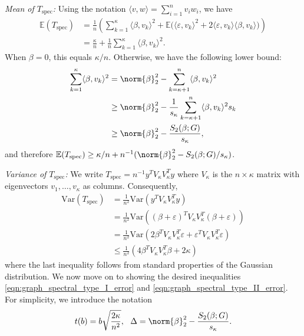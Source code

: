 \documentclass{article}
\newcommand{\Var}{\mathrm{Var}}
\newcommand{\1}{\mathbf{1}}
\newcommand{\Ebb}{\mathbb{E}}
\newcommand{\dotp}[2]{\langle #1, #2 \rangle}
\newcommand{\spec}{\mathrm{spec}}
\theoremstyle{alden}
\theoremstyle{aldenthm}
\theoremstyle{definition}
\theoremstyle{remark}
\begin{document}
\textit{Mean of $T_{\mathrm{spec}}$:} Using the notation $\dotp{v}{w} = \sum_{i = 1}^{n} v_iw_i$, we have
\begin{align*}
\Ebb(T_{\spec}) & = \frac{1}{n}\left(\sum_{k = 1}^{\kappa} \dotp{\beta}{v_k}^2 + \Ebb\bigl( \dotp{\varepsilon}{v_k}^2 + 2 \dotp{\varepsilon}{v_k} \dotp{\beta}{v_k}\bigr)\right) \\
& = \frac{\kappa}{n} + \frac{1}{n}\sum_{k = 1}^{\kappa}\dotp{\beta}{v_k}^2.
\end{align*}
When $\beta = 0$, this equals $\kappa/n$. Otherwise, we have the following lower bound:
\begin{align*}
\sum_{k = 1}^{\kappa}\dotp{\beta}{v_k}^2 & = \norm{\beta}_2^2 - \sum_{k = \kappa + 1}^{n} \dotp{\beta}{v_k}^2 \\
& \geq \norm{\beta}_2^2 - \frac{1}{s_{\kappa}}\sum_{k = \kappa + 1}^{n} \dotp{\beta}{v_k}^2 s_k \\
& \geq \norm{\beta}_2^2 - \frac{S_2(\beta;G)}{s_{\kappa}},
\end{align*}
and therefore $\Ebb(T_{\spec}) \geq \kappa/n + n^{-1}(\norm{\beta}_2^2 - S_2(\beta;G)/s_{\kappa})$. 

\vspace{.2 in}

\textit{Variance of $T_{\mathrm{spec}}$:}
We write $T_{\mathrm{spec}} = n^{-1} y^T V_{\kappa} V_{\kappa}^T y$ where $V_{\kappa}$ is the $n \times \kappa$ matrix with eigenvectors $v_1,\ldots,v_{\kappa}$ as columns. Consequently,
\begin{align}
\Var(T_{\spec}) & = \frac{1}{n^2} \Var(y^T V_{\kappa} V_{\kappa}^T y) \\
& = \frac{1}{n^2} \Var((\beta + \varepsilon)^T V_{\kappa} V_{\kappa}^T (\beta + \varepsilon)) \\
& = \frac{1}{n^2} \Var(2 \beta^T V_{\kappa} V_{\kappa}^T \varepsilon + \varepsilon^T V_{\kappa} V_{\kappa}^T \varepsilon) \\
& \leq \frac{1}{n^2}(4 \beta^T V_{\kappa} V_{\kappa}^T \beta + 2\kappa)
\end{align}
where the last inequality follows from standard properties of the Gaussian distribution. We now move on to showing the desired inequalities \eqref{eqn:graph_spectral_type_I_error} and \eqref{eqn:graph_spectral_type_II_error}.
For simplicity, we introduce the notation
\begin{equation*}
t(b) = b\sqrt{\frac{2\kappa}{n^2}}, ~~ \Delta = \norm{\beta}_2^2 - \frac{S_2(\beta;G)}{s_{\kappa}}.
\end{equation*}
\end{document}
